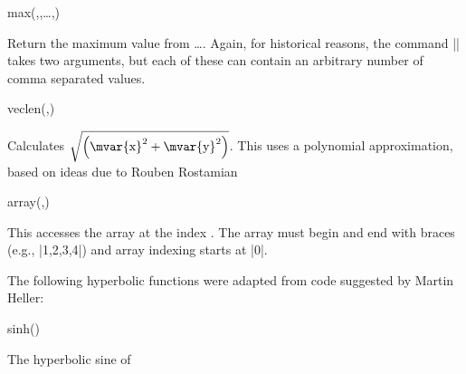 \begin{math-function}{max(,,\ldots,)}

  Return the maximum value from \ldots{}. 
  Again, for historical reasons, the command |\pgfmathmax| takes two
  arguments, but each of these can contain an arbitrary number
  of comma separated values.

\begin{codeexample}[]
 \pgfmathresult
\end{codeexample}

\end{math-function}


\begin{math-function}{veclen(,)}
\mathcommand

 Calculates $\sqrt{\left(\textrm{\mvar{x}}^2+\textrm{\mvar{y}}^2\right)}$.
 This uses a polynomial approximation, based on ideas due
 to Rouben Rostamian
\begin{codeexample}[]
 \pgfmathresult
\end{codeexample}

\end{math-function}





\begin{math-function}{array(,)}
\mathcommand

	This accesses the array  at the index . The
	array must begin and end with braces (e.g., |{1,2,3,4}|) and
	array indexing starts at |0|.
	
\begin{codeexample}[]
 \pgfmathresult
\end{codeexample}

\end{math-function}


The following hyperbolic functions were adapted from code 
suggested by Martin Heller:

\begin{math-function}{sinh()}
\mathcommand

	The hyperbolic sine of %
	
\begin{codeexample}[]
 \pgfmathresult
\end{codeexample}

\end{math-function}

